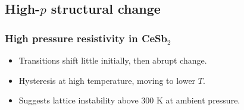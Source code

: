 \subsection{High-$p$ structural change}
\begin{frame}[label=CeSb2Res]
\frametitle{High pressure resistivity in CeSb$_2$}
\vspace{-3em}
\centerline{ }
\vspace{-2em}
\begin{itemize}
\item <visible@2-> Transitions shift little initially, then abrupt change.

\item <visible@3-> Hysteresis at high temperature, moving to lower $T$.

\item <visible@3-> Suggests lattice instability above 300 K at ambient pressure.
\end{itemize}

\end{frame}


